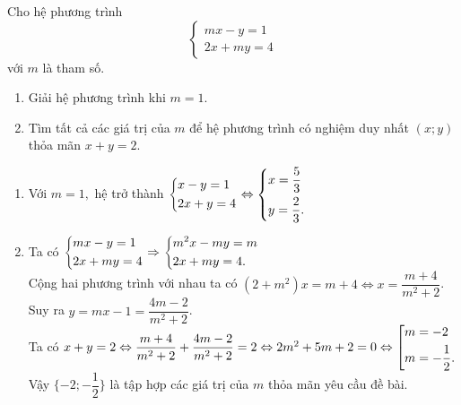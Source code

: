 \begin{bt}%
	Cho hệ phương trình $$ \begin{cases} 
	mx-y=1 \\  2x+my=4 \end{cases}$$ với $m$ là tham số.
	\begin{enumerate}
		\item Giải hệ phương trình khi $m = 1$.
		\item Tìm tất cả các giá trị của $m$ để hệ phương trình có nghiệm duy nhất $(x;y)$ thỏa mãn $x + y = 2.$
	\end{enumerate}
	\loigiai
	{
		\begin{enumerate}
			\item Với $m=1,$ hệ trở thành  $ \left\{\begin{aligned}& x-y=1 \\ & 2x+y=4\end{aligned}\right. \Leftrightarrow \left\{\begin{aligned}& x = \dfrac{5}{3} \\ & y = \dfrac{2}{3}.\end{aligned}\right.$ 
			\item  Ta có $\left\{\begin{aligned}&mx-y=1 \\ &2x+my=4\end{aligned}\right. \Rightarrow \left\{\begin{aligned}&m^2x -my=m \\ &2x+my=4.\end{aligned}\right.$
			\\ Cộng hai phương trình với nhau ta có $(2+m^2)x=m+4 \Leftrightarrow x =\dfrac{m+4}{m^2+2}$.
			\\ Suy ra $y=mx-1 = \dfrac{4m-2}{m^2+2}$.
			\\ Ta có $x+y=2 \Leftrightarrow \dfrac{m+4}{m^2+2}+  \dfrac{4m-2}{m^2+2}= 2 \Leftrightarrow 2m^2 +5m+2=0 \Leftrightarrow \left[\begin{aligned}& m = -2 \\& m = -\dfrac{1}{2}.\end{aligned}\right.$
			\\ Vậy $\{-2; -\dfrac{1}{2}\}$ là tập hợp các giá trị của $m$ thỏa mãn yêu cầu đề bài.
		\end{enumerate}
	}
\end{bt}

